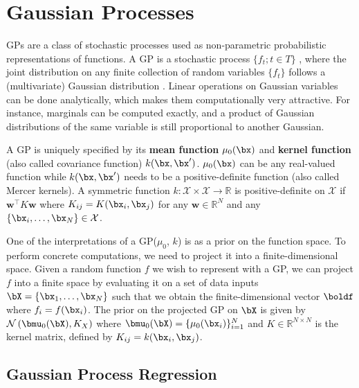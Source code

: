 \section{Gaussian Processes}
\label{sec:gps}

\acf{GPs} are a class of stochastic processes used as non-parametric probabilistic representations of functions.
A \ac{GP} is a stochastic process $\{f_t;t\in T\}$ , where the joint distribution on any finite collection of random variables $\{f_t\}$ follows a (multivariate) Gaussian distribution \cite{rasmussen2006gaussian}.
Linear operations on Gaussian variables can be done analytically, which makes them computationally very attractive.
For instance, marginals can be computed exactly, and a product of Gaussian distributions of the same variable is still proportional to another Gaussian.

A \ac{GP} is uniquely specified by its \textbf{mean function} $\mu_0(\bx)$ and \textbf{kernel function} (also called covariance function) $k(\bx, \bx')$.
$\mu_0(\bx)$ can be any real-valued function while $k(\bx, \bx')$ needs to be a positive-definite function (also called Mercer kernels).
A symmetric function $k:\mathcal{X}\times\mathcal{X}\rightarrow \mathbb{R} $ is positive-definite on $\mathcal{X}$ if $\boldsymbol{w}^\top K \boldsymbol{w}$ where $K_{ij} = K(\bx_i,\bx_j)$ for any $\boldsymbol{w}\in\mathbb{R}^N$ and any $\{\bx_i,\ldots,\bx_N\} \in \mathcal{X}$.

One of the interpretations of a \ac{GP}($\mu_0$, $k$) is as a prior on the function space.
To perform concrete computations, we need to project it into a finite-dimensional space.
Given a random function $f$ we wish to represent with a \ac{GP}, we can project $f$ into a finite space by evaluating it on a set of data inputs $\bX = \{\bx_1, \ldots, \bx_N\}$ such that we obtain the finite-dimensional vector $\boldf$ where $f_i = f(\bx_i)$.
The prior on the projected \ac{GP} on $\bX$ is given by $\mathcal{N}\left(\bmu_0(\bX), K_{X}\right)$ where $\bmu_0(\bX) = \{\mu_0(\bx_i)\}_{i=1}^N$ and $K \in \mathbb{R}^{N\times N}$ is the kernel matrix, defined by $K_{ij} = k(\bx_i, \bx_j)$.

\subsection{Gaussian Process Regression}

